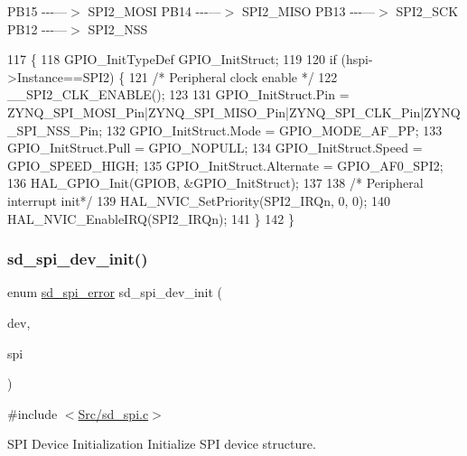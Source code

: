 P\+B15 -\/-\/-\/---$>$ S\+P\+I2\+\_\+\+M\+O\+SI P\+B14 -\/-\/-\/---$>$ S\+P\+I2\+\_\+\+M\+I\+SO P\+B13 -\/-\/-\/---$>$ S\+P\+I2\+\_\+\+S\+CK P\+B12 -\/-\/-\/---$>$ S\+P\+I2\+\_\+\+N\+SS
\begin{DoxyCode}
117 \{
118     GPIO\_InitTypeDef GPIO\_InitStruct;
119     
120     \textcolor{keywordflow}{if} (hspi->Instance==SPI2) \{
121         \textcolor{comment}{/* Peripheral clock enable */}
122         \_\_SPI2\_CLK\_ENABLE();
123   
131         GPIO\_InitStruct.Pin = ZYNQ\_SPI\_MOSI\_Pin|ZYNQ\_SPI\_MISO\_Pin|ZYNQ\_SPI\_CLK\_Pin|ZYNQ\_SPI\_NSS\_Pin;
132         GPIO\_InitStruct.Mode = GPIO\_MODE\_AF\_PP;
133         GPIO\_InitStruct.Pull = GPIO\_NOPULL;
134         GPIO\_InitStruct.Speed = GPIO\_SPEED\_HIGH;
135         GPIO\_InitStruct.Alternate = GPIO\_AF0\_SPI2;
136         HAL\_GPIO\_Init(GPIOB, &GPIO\_InitStruct);
137 
138         \textcolor{comment}{/* Peripheral interrupt init*/}
139         HAL\_NVIC\_SetPriority(SPI2\_IRQn, 0, 0);
140         HAL\_NVIC\_EnableIRQ(SPI2\_IRQn);
141     \}
142 \}
\end{DoxyCode}
\mbox{\label{group___s_d___s_p_i___functions_gaf4898042003aea6ba58eb519eb115284}} 
\subsubsection{\texorpdfstring{sd\+\_\+spi\+\_\+dev\+\_\+init()}{sd\_spi\_dev\_init()}}
{\footnotesize\ttfamily enum \mbox{\hyperlink{group___s_d___s_p_i___types_ga9ae67f7089a8196e9c6b74b8a6708c2e}{sd\+\_\+spi\+\_\+error}} sd\+\_\+spi\+\_\+dev\+\_\+init (\begin{DoxyParamCaption}\item[{struct \mbox{\hyperlink{structsd__spi__dev}{sd\+\_\+spi\+\_\+dev}} $\ast$}]{dev,  }\item[{S\+P\+I\+\_\+\+Handle\+Type\+Def $\ast$}]{spi }\end{DoxyParamCaption})}



{\ttfamily \#include $<$\mbox{\hyperlink{sd__spi_8c}{Src/sd\+\_\+spi.\+c}}$>$}



S\+PI Device Initialization Initialize S\+PI device structure. 


